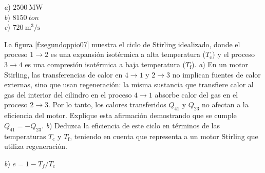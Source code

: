\begin{Answer}
	\begin{minipage}[t]{.4\textwidth}
    \textit{a}) $\SI{2500}{\mega\watt}$\\ \textit{b}) $\SI{8150}{ton}$\\ \textit{c}) $\SI{720}{\cubic\metre/\second}$
  \end{minipage}
\end{Answer}
%
\begin{Exercise}\label{p:segundoppio07}
  La figura \ref{f:segundoppio07} muestra el ciclo de Stirling idealizado, donde el proceso $1 \rightarrow 2$ es una expansión isotérmica a alta temperatura ($T_\text{c}$) y el proceso $3 \rightarrow 4$ es una compresión isotérmica a baja temperatura ($T_\text{f}$). \textit{a}) En un motor Stirling, las transferencias de calor en $4 \rightarrow 1$ y $2 \rightarrow 3$ no implican fuentes de calor externas, sino que usan regeneración: la misma sustancia que transfiere calor al gas del interior del cilindro en el proceso $4 \rightarrow 1$ absorbe calor del gas en el proceso $2 \rightarrow 3$. Por lo tanto, los calores transferidos $Q_{41}$ y $Q_{23}$ no afectan a la eficiencia del motor. Explique esta afirmación demostrando que se cumple $Q_{41} = - Q_{23}$. \textit{b}) Deduzca la eficiencia de este ciclo en términos de las temperaturas $T_\text{c}$ y $T_\text{f}$, teniendo en cuenta que representa a un motor Stirling que utiliza regeneración.
\end{Exercise}
\begin{Answer}
	\begin{minipage}[t]{.4\textwidth}
    \textit{b}) $e = 1 - T_f/T_c$
  \end{minipage}
\end{Answer}
%
